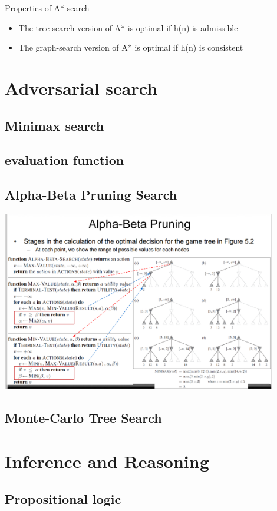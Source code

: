 \documentclass[11pt]{article}
\begin{document}
Properties of A* search
\begin{itemize}
\item The tree-search version of A* is optimal if h(n) is admissible
\item The graph-search version of A* is optimal if h(n) is consistent
\end{itemize}
\section{Adversarial search}
\label{sec:orgf1e2358}

\subsection{Minimax search}
\label{sec:org8005952}
\subsection{evaluation function}
\label{sec:orgcee02aa}
\subsection{Alpha-Beta Pruning Search}
\label{sec:orgb5867b3}
\includegraphics[width=0.9\textwidth]{ABP}
\subsection{Monte-Carlo Tree Search}
\label{sec:orgf7c2418}

\section{Inference and Reasoning}
\label{sec:org091e500}
\subsection{Propositional logic}
\label{sec:orgef113f7}
\end{document}
